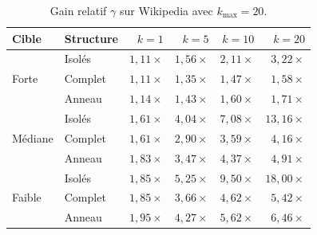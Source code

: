 \documentclass[12pt,a4paper]{article}
\theoremstyle{definition}
\begin{document}
\begin{table}[H]
\centering
\caption{Gain relatif $\gamma$ sur Wikipedia avec $k_{\max}=20$.}
\label{tab:wikipedia}
\small
\begin{tabular}{llrrrr}
\toprule
\textbf{Cible} & \textbf{Structure} & $k=1$ & $k=5$ & $k=10$ & $k=20$ \\
\midrule
\multirow{3}{*}{Forte}
 & Isolés  & $1{,}11\times$ & $1{,}56\times$ & $2{,}11\times$ & $3{,}22\times$ \\
 & Complet & $1{,}11\times$ & $1{,}35\times$ & $1{,}47\times$ & $1{,}58\times$ \\
 & Anneau  & $1{,}14\times$ & $1{,}43\times$ & $1{,}60\times$ & $1{,}71\times$ \\
\midrule
\multirow{3}{*}{Médiane}
 & Isolés  & $1{,}61\times$ & $4{,}04\times$ & $7{,}08\times$ & $13{,}16\times$ \\
 & Complet & $1{,}61\times$ & $2{,}90\times$ & $3{,}59\times$ & $4{,}16\times$ \\
 & Anneau  & $1{,}83\times$ & $3{,}47\times$ & $4{,}37\times$ & $4{,}91\times$ \\
\midrule
\multirow{3}{*}{Faible}
 & Isolés  & $1{,}85\times$ & $5{,}25\times$ & $9{,}50\times$ & $18{,}00\times$ \\
 & Complet & $1{,}85\times$ & $3{,}66\times$ & $4{,}62\times$ & $5{,}42\times$ \\
 & Anneau  & $1{,}95\times$ & $4{,}27\times$ & $5{,}62\times$ & $6{,}46\times$ \\
\bottomrule
\end{tabular}
\end{table}
\end{document}

